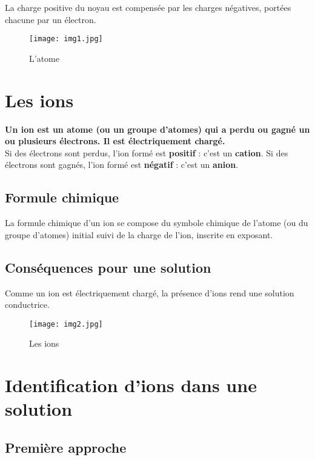 \documentclass[a4paper,12pt]{article}
\begin{document}
La charge positive du noyau est compensée par les charges négatives, portées chacune par un électron.

\begin{figure}[H]
  \centering
  \texttt{[image: img1.jpg]}
  \caption{\label{} L'atome}
\end{figure}

\section*{Les ions}

\begin{tcolorbox}[colback=green!10, colframe=green!80, title=Définition]
\textbf{Un ion est un atome (ou un groupe d’atomes) qui a perdu ou gagné un ou plusieurs électrons. Il est électriquement chargé.} \\
Si des électrons sont perdus, l’ion formé est \textbf{positif} : c’est un \textbf{cation}. Si des électrons sont gagnés, l’ion formé est \textbf{négatif} : c’est un \textbf{anion}.
\end{tcolorbox}

\subsection*{Formule chimique}

La formule chimique d’un ion se compose du symbole chimique de l’atome (ou du groupe d’atomes) initial suivi de la charge de l’ion, inscrite en exposant.

\subsection*{Conséquences pour une solution}

Comme un ion est électriquement chargé, la présence d’ions rend une solution conductrice.

\begin{figure}[H]
  \centering
  \texttt{[image: img2.jpg]}
  \caption{\label{} Les ions}
\end{figure}

\section*{Identification d'ions dans une solution}

\subsection*{Première approche}
\end{document}
